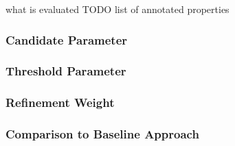 what is evaluated TODO
list of annotated properties 

\subsubsection{Candidate Parameter}
\subsubsection{Threshold Parameter}
\subsubsection{Refinement Weight}
\subsubsection{Comparison to Baseline Approach}